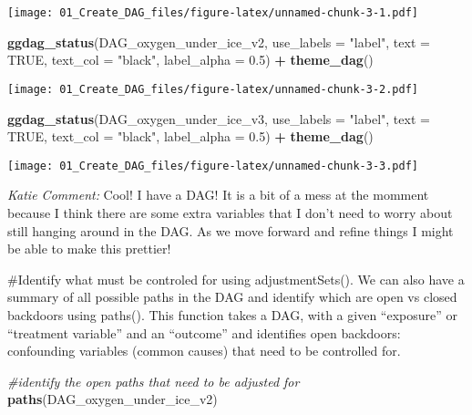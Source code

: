 \documentclass[]{article}
\newenvironment{Shaded}{\begin{snugshade}}{\end{snugshade}}
\newcommand{\CommentTok}[1]{\textcolor[rgb]{0.56,0.35,0.01}{\textit{#1}}}
\newcommand{\DataTypeTok}[1]{\textcolor[rgb]{0.13,0.29,0.53}{#1}}
\newcommand{\FloatTok}[1]{\textcolor[rgb]{0.00,0.00,0.81}{#1}}
\newcommand{\KeywordTok}[1]{\textcolor[rgb]{0.13,0.29,0.53}{\textbf{#1}}}
\newcommand{\NormalTok}[1]{#1}
\newcommand{\OperatorTok}[1]{\textcolor[rgb]{0.81,0.36,0.00}{\textbf{#1}}}
\newcommand{\OtherTok}[1]{\textcolor[rgb]{0.56,0.35,0.01}{#1}}
\newcommand{\StringTok}[1]{\textcolor[rgb]{0.31,0.60,0.02}{#1}}
\begin{document}
\texttt{[image: 01\_Create\_DAG\_files/figure-latex/unnamed-chunk-3-1.pdf]}

\begin{Shaded}
\begin{Highlighting}[]
\KeywordTok{ggdag_status}\NormalTok{(DAG_oxygen_under_ice_v2,}
             \DataTypeTok{use_labels =} \StringTok{"label"}\NormalTok{,}
             \DataTypeTok{text =} \OtherTok{TRUE}\NormalTok{,}
              \DataTypeTok{text_col =} \StringTok{"black"}\NormalTok{,}
             \DataTypeTok{label_alpha =} \FloatTok{0.5}\NormalTok{) }\OperatorTok{+}\StringTok{ }\KeywordTok{theme_dag}\NormalTok{()}
\end{Highlighting}
\end{Shaded}

\texttt{[image: 01\_Create\_DAG\_files/figure-latex/unnamed-chunk-3-2.pdf]}

\begin{Shaded}
\begin{Highlighting}[]
\KeywordTok{ggdag_status}\NormalTok{(DAG_oxygen_under_ice_v3,}
             \DataTypeTok{use_labels =} \StringTok{"label"}\NormalTok{,}
             \DataTypeTok{text =} \OtherTok{TRUE}\NormalTok{,}
              \DataTypeTok{text_col =} \StringTok{"black"}\NormalTok{,}
             \DataTypeTok{label_alpha =} \FloatTok{0.5}\NormalTok{) }\OperatorTok{+}\StringTok{ }\KeywordTok{theme_dag}\NormalTok{()}
\end{Highlighting}
\end{Shaded}

\texttt{[image: 01\_Create\_DAG\_files/figure-latex/unnamed-chunk-3-3.pdf]}

{ \emph{Katie Comment:} Cool! I have a DAG! It is a bit of a mess at the
momment because I think there are some extra variables that I don't need
to worry about still hanging around in the DAG. As we move forward and
refine things I might be able to make this prettier!\\
}

\#Identify what must be controled for using adjustmentSets(). We can
also have a summary of all possible paths in the DAG and identify which
are open vs closed backdoors using paths(). This function takes a DAG,
with a given ``exposure'' or ``treatment variable'' and an ``outcome''
and identifies open backdoors: confounding variables (common causes)
that need to be controlled for.

\begin{Shaded}
\begin{Highlighting}[]
\CommentTok{#identify the open paths that need to be adjusted for }
\KeywordTok{paths}\NormalTok{(DAG_oxygen_under_ice_v2)}
\end{Highlighting}
\end{Shaded}
\end{document}
